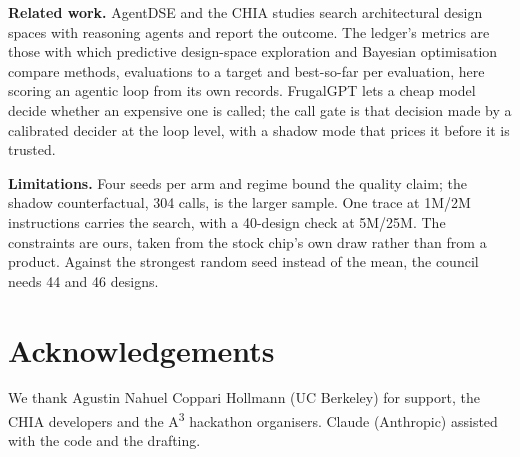 \documentclass[conference]{IEEEtran}
\begin{document}
\textbf{Related work.} AgentDSE \cite{agentdse} and the CHIA studies \cite{chia} search
architectural design spaces with reasoning agents and report the outcome. The ledger's metrics
are those with which predictive design-space exploration \cite{ipek} and Bayesian optimisation
\cite{snoek} compare methods, evaluations to a target and best-so-far per evaluation, here
scoring an agentic loop from its own records. FrugalGPT \cite{frugalgpt} lets a cheap model
decide whether an expensive one is called; the call gate is that decision made by a calibrated
decider \cite{typesafe} at the loop level, with a shadow mode that prices it before it is trusted.

\textbf{Limitations.} Four seeds per arm and regime bound the quality claim; the shadow
counterfactual, 304 calls, is the larger sample. One trace at 1M/2M instructions carries the
search, with a 40-design check at 5M/25M. The constraints are ours, taken from the stock chip's
own draw rather than from a product. Against the strongest random seed instead of the mean, the
council needs 44 and 46 designs. %

\section*{Acknowledgements}
We thank Agustin Nahuel Coppari Hollmann (UC Berkeley) for support, the CHIA developers and
the A\textsuperscript{3} hackathon organisers. Claude (Anthropic) assisted with the code and the
drafting.



\end{document}
